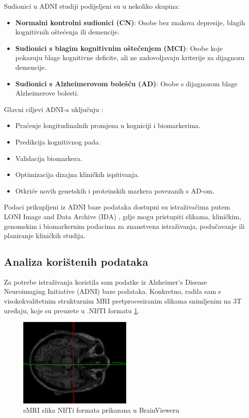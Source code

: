 \documentclass[zavrsnirad]{fer}
\begin{document}
Sudionici u ADNI studiji podijeljeni su u nekoliko skupina:

\begin{itemize}
	\item \textbf{Normalni kontrolni sudionici (CN)}: Osobe bez znakova depresije, blagih kognitivnih oštećenja ili demencije.
	\item\textbf{Sudionici s blagim kognitivnim oštećenjem (MCI)}: Osobe koje pokazuju blage kognitivne deficite, ali ne zadovoljavaju kriterije za dijagnozu demencije.
	\item \textbf{Sudionici s Alzheimerovom bolešću (AD)}: Osobe s dijagnozom blage Alzheimerove bolesti.
\end{itemize}

Glavni ciljevi ADNI-a uključuju \cite{adni_about}:
\begin{itemize}
	\item Praćenje longitudinalnih promjena u kogniciji i biomarkerima.
	\item Predikcija kognitivnog pada.
	\item Validacija biomarkera.
	\item Optimizacija dizajna kliničkih ispitivanja.
	\item Otkriće novih genetskih i proteinskih markera povezanih s AD-om.
\end{itemize}

Podaci prikupljeni iz ADNI baze podataka dostupni su istraživačima putem LONI Image and Data Archive (IDA) \cite{usc_loni}, gdje mogu pristupiti slikama, kliničkim, genomskim i biomarkernim podacima za znanstvena istraživanja, podučavanje ili planiranje kliničkih studija.

\subsection{Analiza korištenih podataka}
Za potrebe istraživanja koristila sam podatke iz Alzheimer's Disease Neuroimaging Initiative (ADNI) baze podataka. Konkretno, radila sam s visokokvalitetnim strukturnim MRI pretprocesiranim slikama snimljenim na 3T uređaju, koje su preuzete u .NIfTI formatu \ref{fig:nifti}.

\begin{figure}[h]
	\centering
	\includegraphics[width=0.5\textwidth]{Figures/primjer_slike.png}
	\caption{sMRI slika NIfTi formata prikazana u BrainVieweru\cite{umich_brainviewer}}
	\label{fig:nifti}
\end{figure}
 
\end{document}
